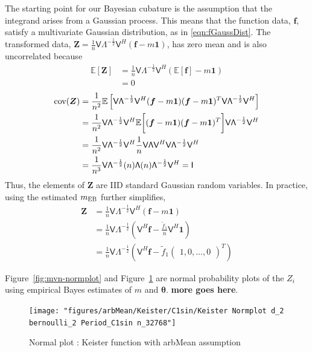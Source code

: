 \documentclass{iitthesis}          %
\newcommand{\bm}[1]{\boldsymbol{#1}}
\newcommand{\Ex}{\mathbb{E}}
\newcommand{\vtheta}{{\bm{\theta}}}
\newcommand{\vf}{\bm{f}}
\newcommand{\vZ}{\bm{Z}}
\newcommand{\vone}{\bm{1}}
\newcommand{\cov}{{\textup{cov}}}
\newcommand{\mLambda}{\mathsf{\Lambda}}
\newcommand{\mV}{\mathsf{V}}
\newcommand{\MLE}{\textup{EB}}
\newcommand\figref{Figure~\ref}
\begin{document}
{{{{{{The starting point for our Bayesian cubature is the assumption that the integrand arises from a Gaussian process. This means that the function data, $\vf$, satisfy a multivariate Gaussian distribution, as in \eqref{eqn:fGaussDist}.  The transformed data, $\vZ = \frac 1n \mV \mLambda^{-\frac 12} \mV^H(\vf - m \vone)$, has zero mean and is also uncorrelated because
\begin{align*}
\Ex\left[\vZ \right] &= 
\frac 1n \mV \mLambda^{-\frac 12} \mV^H(\Ex\left[\vf\right] - m \vone) 
\\
& = 0
\end{align*}
\begin{align*}
\cov (\vZ) 
&= \frac {1}{n^2} \Ex\left[  
\mV \mLambda^{-\frac 12} \mV^H (\vf - m \vone)
(\vf - m \vone)^T \mV \mLambda^{-\frac 12} \mV^H
\right]
\\
&=
\frac {1}{n^2} \mV \mLambda^{-\frac 12} \mV^H 
\Ex \biggl[ (\vf - m \vone)
(\vf - m \vone)^T \biggr] \mV \mLambda^{-\frac 12} \mV^H
\\ %
&=
\frac{1}{n^2} \mV \mLambda^{-\frac 12} \mV^H 
\frac 1n \mV \mLambda \mV^H \mV \mLambda^{-\frac 12} \mV^H
\\
&=
\frac{1}{n^3} \mV \mLambda^{-\frac 12} (n) \mLambda (n) \mLambda^{-\frac 12} \mV^H
= \mathsf{I}
\end{align*}
Thus, the elements of $\vZ$ are IID standard Gaussian random variables.  
In practice, using the estimated $m_\MLE$ further simplifies, 
\begin{align*}
\vZ &= \frac 1n \mV \mLambda^{-\frac 12} \mV^H(\vf - m \vone) \\
 &= \frac 1n \mV \mLambda^{-\frac 12} (\mV^H \vf - \frac{\tilde{f}_1}{n} \mV^H \vone) 
\\
 &= \frac 1n \mV \mLambda^{-\frac 12} \left(\mV^H \vf - \tilde{f}_1 \begin{pmatrix}1, 0, \hdots, 0 \end{pmatrix}^T \right) 
\end{align*}

\figref{fig:mvn-normplot} and \figref{fig:keister-normplot} are normal probability plots of the $Z_i$ using empirical Bayes estimates of $m$ and $\vtheta$. \textbf{more goes here}.


\iffalse
\begin{figure}[ht]
	\centering
	\texttt{[image: "figures/arbMean/Keister/C1sin/Keister Normplot d\_2 bernoulli\_2 Period\_C1sin n\_32768"]}
	\caption{Normal plot : Keister function with arbMean assumption}
	\label{fig:keister-normplot}
\end{figure}

}}}}}}
\end{document}
